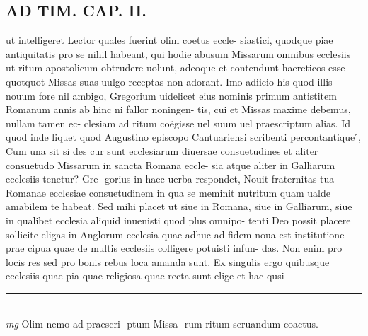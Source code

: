 \documentclass{article}
\begin{document}
\begin{pages}
\section*{AD TIM. CAP. II. }
\marginpar{[ p.111 ]}\pstart ut intelligeret Lector quales fuerint olim coetus eccle- siastici, quodque piae antiquitatis pro se nihil habeant, qui hodie abusum Missarum omnibus ecclesiis ut ritum apostolicum obtrudere uolunt, adeoque et contendunt haereticos esse quotquot Missas suas uulgo receptas non adorant. Imo adiicio his quod illis nouum fore nil ambigo, Gregorium uidelicet eius nominis primum antistitem Romanum annis ab hinc ni fallor noningen- tis, cui et Missas maxime debemus, nullam tamen ec- clesiam ad ritum coëgisse uel suum uel praescriptum alias. Id quod inde liquet quod Augustino episcopo Cantuariensi scribenti percontantique ́, Cum una sit si des cur sunt ecclesiarum diuersae consuetudines et aliter consuetudo Missarum in sancta Romana eccle- sia atque aliter in Galliarum ecclesiis tenetur? Gre- gorius in haec uerba respondet, Nouit fraternitas tua Romanae ecclesiae consuetudinem in qua se meminit nutritum quam ualde amabilem te habeat. Sed mihi placet ut siue in Romana, siue in Galliarum, siue in qualibet ecclesia aliquid inuenisti quod plus omnipo- tenti Deo possit placere sollicite eligas in Anglorum ecclesia quae adhuc ad fidem noua est institutione prae cipua quae de multis ecclesiis colligere potuisti infun- das. Non enim pro locis res sed pro bonis rebus loca amanda sunt. Ex singulis ergo quibusque ecclesiis quae pia quae religiosa quae recta sunt elige et hac qusi  \pend
\vspace{0.5cm}\noindent
\vspace{0.2cm}\rule{1cm}{0.2pt}\\ 
\hspace{0.2cm}\textit{mg}
\footnotesize Olim nemo ad praescri- ptum Missa- rum ritum seruandum coactus. 
\normalsize| 

\end{pages}
\end{document}
